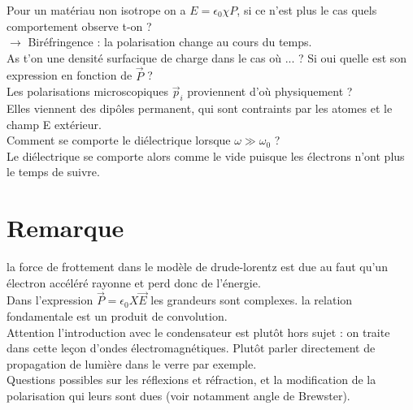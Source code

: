 \documentclass[12pt,prb,aps,epsf]{report}
\begin{document}
Pour un matériau non isotrope on a $E = \epsilon_0 \chi P$, si ce n'est plus le cas quels comportement observe t-on ?\\
$\rightarrow$ Biréfringence : la polarisation change au cours du temps.\\

As t'on une densité surfacique de charge dans le cas où ... ? Si oui quelle est son expression en fonction de $\vec{P}$ ?\\

Les polarisations microscopiques $\vec{p}_i$ proviennent d'où physiquement ? \\
Elles viennent des dipôles permanent, qui sont contraints par les atomes et le champ E extérieur.\\

Comment se comporte le diélectrique lorsque $\omega \gg \omega_0$ ?\\
Le diélectrique se comporte alors comme le vide puisque les électrons n'ont plus le temps de suivre.



\section*{Remarque}
la force de frottement dans le modèle de drude-lorentz est due au faut qu'un électron accéléré rayonne et perd donc de l'énergie.\\
Dans l'expression $ \vec{P}=\epsilon_0X\vec{E}$ les grandeurs sont complexes. la relation fondamentale est un produit de convolution.\\
Attention l'introduction avec le condensateur est plutôt hors sujet : on traite dans cette leçon d'ondes électromagnétiques. Plutôt parler directement de propagation de lumière dans le verre par exemple.\\
Questions possibles sur les réflexions et réfraction, et la modification de la polarisation qui leurs sont dues (voir notamment angle de Brewster).
\end{document}
